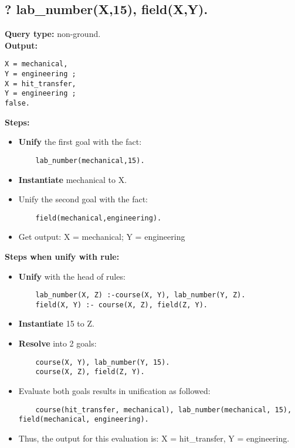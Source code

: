 \newpage
\subsection{? lab\_number(X,15), field(X,Y).}
\textbf{Query type: } non-ground. \\
\textbf{Output:} \\
\begin{lstlisting}
X = mechanical,
Y = engineering ;
X = hit_transfer,
Y = engineering ;
false.
\end{lstlisting}

\textbf{Steps:}
\begin{itemize}
    \item \textbf{Unify} the first goal with the fact:
    \begin{lstlisting}
    lab_number(mechanical,15).
    \end{lstlisting}
    \item \textbf{Instantiate} mechanical to X.
    \item Unify the second goal with the fact:
    \begin{lstlisting}
    field(mechanical,engineering).
    \end{lstlisting}
\item Get output: X = mechanical; Y = engineering
\end{itemize}

\textbf{Steps when unify with rule:}
\begin{itemize}
    \item \textbf{Unify} with the head of rules:
    \begin{lstlisting}
    lab_number(X, Z) :-course(X, Y), lab_number(Y, Z).
    field(X, Y) :- course(X, Z), field(Z, Y).
    \end{lstlisting}
    \item \textbf{Instantiate} 15 to Z.
    \item \textbf{Resolve} into 2 goals:
    \begin{lstlisting}
    course(X, Y), lab_number(Y, 15).
    course(X, Z), field(Z, Y).
    \end{lstlisting}
\item Evaluate both goals results in unification as followed:
    \begin{lstlisting}
    course(hit_transfer, mechanical), lab_number(mechanical, 15), field(mechanical, engineering).
    \end{lstlisting}
\item Thus, the output for this evaluation is: X = hit\_transfer, Y = engineering.
\end{itemize}


